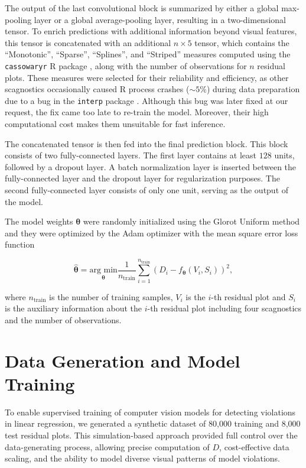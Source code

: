 \documentclass[]{interact}
\theoremstyle{plain}%
\theoremstyle{definition}
\theoremstyle{remark}
\begin{document}
The output of the last convolutional block is summarized by either a
global max-pooling layer or a global average-pooling layer, resulting in
a two-dimensional tensor. To enrich predictions with additional
information beyond visual features, this tensor is concatenated with an
additional \(n \times 5\) tensor, which contains the ``Monotonic'',
``Sparse'', ``Splines'', and ``Striped'' measures computed using the
\texttt{cassowaryr} R package \citep{mason2022cassowaryr} , along with
the number of observations for \(n\) residual plots. These measures were
selected for their reliability and efficiency, as other scagnostics
occasionally caused R process crashes (\(\sim 5\%\)) during data
preparation due to a bug in the \texttt{interp} package
\citep{Albrecht2023interp}. Although this bug was later fixed at our
request, the fix came too late to re-train the model. Moreover, their
high computational cost makes them unsuitable for fast inference.

The concatenated tensor is then fed into the final prediction block.
This block consists of two fully-connected layers. The first layer
contains at least \(128\) units, followed by a dropout layer. A batch
normalization layer is inserted between the fully-connected layer and
the dropout layer for regularization purposes. The second
fully-connected layer consists of only one unit, serving as the output
of the model.

The model weights \(\boldsymbol{\theta}\) were randomly initialized
using the Glorot Uniform method \citep{glorot2010understanding} and they
were optimized by the Adam optimizer \citep{kingma2014adam} with the
mean square error loss function

\[\hat{\boldsymbol{\theta}} = \underset{\boldsymbol{\theta}}{\text{arg min}}\frac{1}{n_{\text{train}}}\sum_{i=1}^{n_{\text{train}}}(D_i - f_{\boldsymbol{\theta}}(V_i, S_i))^2,\]

\noindent where \(n_{\text{train}}\) is the number of training samples,
\(V_i\) is the \(i\)-th residual plot and \(S_i\) is the auxiliary
information about the \(i\)-th residual plot including four scagnostics
and the number of observations.

\section{Data Generation and Model
Training}\label{sec-model-data-generation}

To enable supervised training of computer vision models for detecting
violations in linear regression, we generated a synthetic dataset of
80,000 training and 8,000 test residual plots. This simulation-based
approach provided full control over the data-generating process,
allowing precise computation of \(D\), cost-effective data scaling, and
the ability to model diverse visual patterns of model violations.
\end{document}
